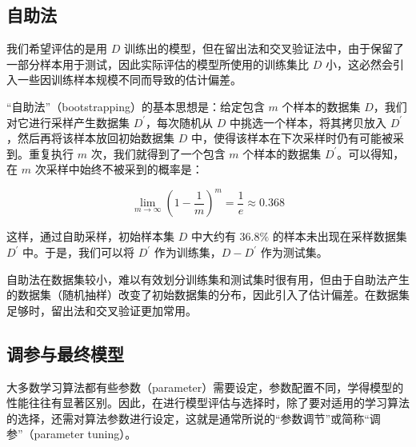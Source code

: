 \documentclass[12pt, a4paper]{article} %
\begin{document}
\subsection{自助法}

我们希望评估的是用 $D$ 训练出的模型，但在留出法和交叉验证法中，由于保留了一部分样本用于测试，因此实际评估的模型所使用的训练集比 $D$ 小，这必然会引入一些因训练样本规模不同而导致的估计偏差。

“自助法”（bootstrapping）的基本思想是：给定包含 $m$ 个样本的数据集 $D$，我们对它进行采样产生数据集 $D ^\prime$，每次随机从 $D$ 中挑选一个样本，将其拷贝放入 $D ^\prime$，然后再将该样本放回初始数据集 $D$ 中，使得该样本在下次采样时仍有可能被采到。重复执行 $m$ 次，我们就得到了一个包含 $m$ 个样本的数据集 $D ^\prime$。可以得知，在 $m$ 次采样中始终不被采到的概率是：

\begin{equation}
    \lim_{m \to \infty} (1 - \frac{1}{m})^m = \frac{1}{e} \approx 0.368
\end{equation}

这样，通过自助采样，初始样本集 $D$ 中大约有 $36.8\%$ 的样本未出现在采样数据集 $D ^\prime$ 中。于是，我们可以将 $D ^\prime$ 作为训练集，$D - D^\prime$ 作为测试集。

自助法在数据集较小，难以有效划分训练集和测试集时很有用，但由于自助法产生的数据集（随机抽样）改变了初始数据集的分布，因此引入了估计偏差。在数据集足够时，留出法和交叉验证更加常用。

\subsection{调参与最终模型}

大多数学习算法都有些参数（parameter）需要设定，参数配置不同，学得模型的性能往往有显著区别。因此，在进行模型评估与选择时，除了要对适用的学习算法的选择，还需对算法参数进行设定，这就是通常所说的“参数调节”或简称“调参”（parameter tuning）。
\end{document}
